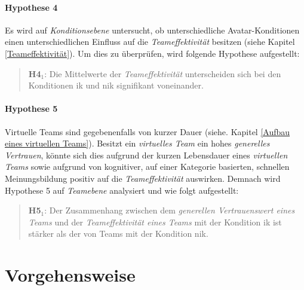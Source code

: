 \documentclass[a4paper,11pt]{article}%
\renewcommand{\\}{\vspace*{0.5\baselineskip} \newline}
\begin{document}
\paragraph{Hypothese 4}
Es wird auf \textit{Konditionsebene} untersucht, ob unterschiedliche Avatar-Konditionen einen unterschiedlichen Einfluss auf die \textit{Teameffektivität} besitzen (siehe Kapitel \ref{Teameffektivität}).
Um dies zu überprüfen, wird folgende Hypothese aufgestellt:
\begin{quote}
\textbf{H4$_{1}$}: Die Mittelwerte der \textit{Teameffektivität} unterscheiden sich bei den Konditionen \newline \ac{ik} und \ac{nik} signifikant voneinander.
\end{quote}

\newpage
\paragraph{Hypothese 5}
Virtuelle Teams sind gegebenenfalls von kurzer Dauer (siehe. Kapitel \ref{Aufbau eines virtuellen Teams}). Besitzt ein \textit{virtuelles Team} ein hohes \textit{generelles Vertrauen}, könnte sich dies aufgrund der kurzen Lebensdauer eines \textit{virtuellen Teams} sowie aufgrund von kognitiver, auf einer Kategorie basierten, schnellen Meinungsbildung positiv auf die \textit{Teameffektivität} auswirken. Demnach wird Hypothese 5 auf \textit{Teamebene} analysiert und wie folgt aufgestellt:
\begin{quote}
\textbf{H5$_{1}$}: Der Zusammenhang zwischen dem \textit{generellen Vertrauenswert eines Teams} und der \textit{Teameffektivität eines Teams} mit der Kondition \ac{ik} ist stärker als der von Teams mit der Kondition \ac{nik}.
\end{quote}
\newpage
\section{Vorgehensweise}
\end{document}
